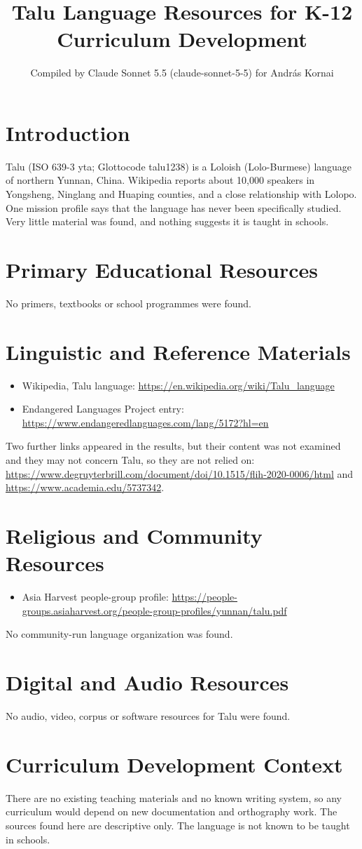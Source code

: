 \documentclass[12pt]{article}
\title{Talu Language Resources for K-12 Curriculum Development}
\author{Compiled by Claude Sonnet 5.5 (claude-sonnet-5-5) for Andr\'as Kornai}
\date{}
\begin{document}
\maketitle

\section{Introduction}
Talu (ISO 639-3 yta; Glottocode talu1238) is a Loloish (Lolo-Burmese) language of northern Yunnan, China. Wikipedia reports about 10,000 speakers in Yongsheng, Ninglang and Huaping counties, and a close relationship with Lolopo. One mission profile says that the language has never been specifically studied. Very little material was found, and nothing suggests it is taught in schools.

\section{Primary Educational Resources}
No primers, textbooks or school programmes were found.

\section{Linguistic and Reference Materials}
\begin{itemize}
\item Wikipedia, Talu language: \url{https://en.wikipedia.org/wiki/Talu_language}
\item Endangered Languages Project entry: \url{https://www.endangeredlanguages.com/lang/5172?hl=en}
\end{itemize}
Two further links appeared in the results, but their content was not examined and they may not concern Talu, so they are not relied on: \url{https://www.degruyterbrill.com/document/doi/10.1515/flih-2020-0006/html} and \url{https://www.academia.edu/5737342}.

\section{Religious and Community Resources}
\begin{itemize}
\item Asia Harvest people-group profile: \url{https://people-groups.asiaharvest.org/people-group-profiles/yunnan/talu.pdf}
\end{itemize}
No community-run language organization was found.

\section{Digital and Audio Resources}
No audio, video, corpus or software resources for Talu were found.

\section{Curriculum Development Context}
There are no existing teaching materials and no known writing system, so any curriculum would depend on new documentation and orthography work. The sources found here are descriptive only. The language is not known to be taught in schools.
\end{document}
